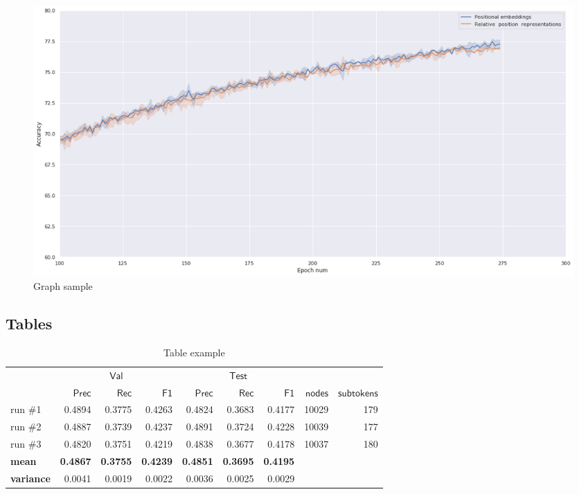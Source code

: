 \documentclass[a4paper,14pt]{extarticle}
\begin{document}
\begin{figure}[h!]
	\centering
	\includegraphics[width=1\textwidth]{graph2.png}
	\caption{Graph sample}
	\label{fig:by_epochs}
\end{figure}

\pagebreak

\subsection{Tables}

\begin{table}[htbp]
	\caption{Table example}
	\label{table:long_epochs}
	\footnotesize
	\centering
	\begin{tabular}{lrrrrrrrr}
		\toprule
		              & \multicolumn{3}{c}{$\mathsf{Val}$} &
		\multicolumn{3}{c}{$\mathsf{Test}$}                                                                                                                                              \\
		\cmidrule(lr){2-4} \cmidrule(l){5-7}
		{}            & $\mathsf{Prec}$                    & $\mathsf{Rec}$ & $\mathsf{F1}$ & $\mathsf{Prec}$ & $\mathsf{Rec}$ & $\mathsf{F1}$ & $\mathsf{nodes}$ & $\mathsf{subtokens}$ \\
		\midrule
		run \#1       & 0.4894                             & 0.3775         & 0.4263        & 0.4824          & 0.3683         & 0.4177        & 10029            & 179                  \\
		run \#2       & 0.4887                             & 0.3739         & 0.4237        & 0.4891          & 0.3724         & 0.4228        & 10039            & 177                  \\
		run \#3       & 0.4820                             & 0.3751         & 0.4219        & 0.4838          & 0.3677         & 0.4178        & 10037            & 180                  \\
		\midrule
		\bf{mean}     & \bf{0.4867}                        & \bf{0.3755}    & \bf{0.4239}   & \bf{ 0.4851}    & \bf{0.3695}    & \bf{0.4195}                                             \\
		\bf{variance} & 0.0041                             & 0.0019         & 0.0022        & 0.0036          & 0.0025         & 0.0029                                                  \\
		\bottomrule
	\end{tabular}
\end{table}


\newpage

\printbibliography[heading=bibintoc]   %
\end{document}
